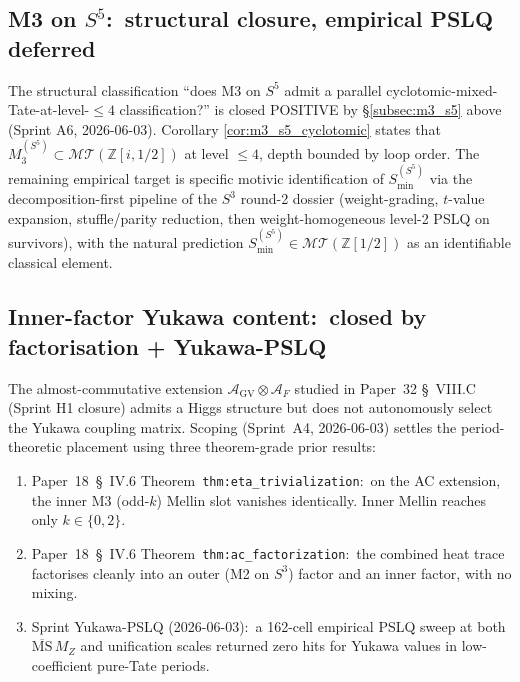 \documentclass[11pt,a4paper]{article}
\theoremstyle{plain}
\theoremstyle{definition}
\newcommand{\sthree}{S^{3}}
\newcommand{\sfive}{S^{5}}
\newcommand{\Z}{\mathbb{Z}}
\newcommand{\MT}{\mathcal{MT}}
\begin{document}
\subsection{M3 on $\sfive$:\ structural closure, empirical PSLQ deferred}
\label{subsec:open_s5_m3}

The structural classification ``does M3 on $\sfive$ admit a parallel
cyclotomic-mixed-Tate-at-level-$\le 4$ classification?'' is closed
POSITIVE by \S\ref{subsec:m3_s5} above (Sprint A6, 2026-06-03).  Corollary
\ref{cor:m3_s5_cyclotomic} states that $M_3^{(\sfive)} \subset
\MT(\Z[i, 1/2])$ at level $\le 4$, depth bounded by loop order.  The
remaining empirical target is specific motivic identification of
$S_{\min}^{(\sfive)}$ via the decomposition-first pipeline of the
$\sthree$ round-2 dossier (weight-grading, $t$-value expansion,
stuffle/parity reduction, then weight-homogeneous level-2 PSLQ on
survivors), with the natural prediction
$S_{\min}^{(\sfive)} \in \MT(\Z[1/2])$ as an identifiable classical
element.

\subsection{Inner-factor Yukawa content:\ closed by factorisation +
Yukawa-PSLQ}
\label{subsec:open_inner_yukawa}

The almost-commutative extension
$\mathcal{A}_{\mathrm{GV}} \otimes \mathcal{A}_F$ studied in
Paper~32 \S~VIII.C~\cite{loutey_paper32} (Sprint H1 closure) admits a
Higgs structure but does not autonomously select the Yukawa coupling
matrix.  Scoping (Sprint~A4, 2026-06-03) settles the period-theoretic
placement using three theorem-grade prior results:

\begin{enumerate}
  \item Paper~18~\S~IV.6 Theorem~\texttt{thm:eta\_trivialization}:\ on the
    AC extension, the inner M3 (odd-$k$) Mellin slot vanishes identically.
    Inner Mellin reaches only $k \in \{0, 2\}$.
  \item Paper~18~\S~IV.6 Theorem~\texttt{thm:ac\_factorization}:\ the
    combined heat trace factorises cleanly into an outer (M2 on $\sthree$)
    factor and an inner factor, with no mixing.
  \item Sprint Yukawa-PSLQ (2026-06-03):\ a 162-cell empirical
    PSLQ sweep at both $\overline{\mathrm{MS}}\,M_Z$ and unification scales
    returned zero hits for Yukawa values in low-coefficient pure-Tate
    periods.
\end{enumerate}
\end{document}
